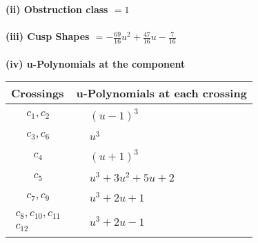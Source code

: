 \documentclass[1p]{elsarticle_modified}
\theoremstyle{definition}
\begin{document}
\flushleft \textbf{(ii) Obstruction class $= 1$}\\~\\
\flushleft \textbf{(iii) Cusp Shapes $= -\frac{69}{16} u^2+\frac{47}{16} u-\frac{7}{16}$}\\~\\
\newpage\renewcommand{\arraystretch}{1}
\flushleft \textbf{(iv) u-Polynomials at the component}\newline \\
\begin{tabular}{m{50pt}|m{274pt}}
Crossings & \hspace{64pt}u-Polynomials at each crossing \\
\hline $$\begin{aligned}c_{1},c_{2}\end{aligned}$$&$\begin{aligned}
&(u-1)^3
\end{aligned}$\\
\hline $$\begin{aligned}c_{3},c_{6}\end{aligned}$$&$\begin{aligned}
&u^3
\end{aligned}$\\
\hline $$\begin{aligned}c_{4}\end{aligned}$$&$\begin{aligned}
&(u+1)^3
\end{aligned}$\\
\hline $$\begin{aligned}c_{5}\end{aligned}$$&$\begin{aligned}
&u^3+3 u^2+5 u+2
\end{aligned}$\\
\hline $$\begin{aligned}c_{7},c_{9}\end{aligned}$$&$\begin{aligned}
&u^3+2 u+1
\end{aligned}$\\
\hline $$\begin{aligned}c_{8},c_{10},c_{11}\\c_{12}\end{aligned}$$&$\begin{aligned}
&u^3+2 u-1
\end{aligned}$\\
\hline
\end{tabular}\\~\\
\end{document}
